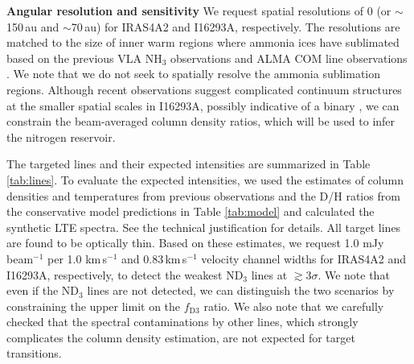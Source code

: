 \documentclass[12pt,a4paper]{article}  %
\begin{document}
\noindent \textbf{Angular resolution and sensitivity} \quad We request spatial resolutions of 0 (or $\sim$150\,au and $\sim$70\,au) for IRAS4A2 and I16293A, respectively. The resolutions are matched to the size of inner warm regions where ammonia ices have sublimated based on the previous VLA NH$_3$ observations \citep[][, article in preparation]{Choi10} and ALMA COM line observations \citep{Manigand20}. We note that we do not seek to spatially resolve the ammonia sublimation regions. Although recent observations suggest complicated continuum structures at the smaller spatial scales in I16293A, possibly indicative of a binary \citep{Maureira20}, we can constrain the beam-averaged column density ratios, which will be used to infer the nitrogen reservoir.

The targeted lines and their expected intensities are summarized in Table \ref{tab:lines}. To evaluate the expected intensities, we used the estimates of column densities and temperatures from previous observations and the D/H ratios from the conservative model predictions in Table \ref{tab:model} and calculated the synthetic LTE spectra. See the technical justification for details. 
All target lines are found to be optically thin. Based on these estimates, we request 1.0 mJy beam$^{-1}$ per 1.0 km\,s$^{-1}$ and 0.83\,km\,s$^{-1}$ velocity channel widths for IRAS4A2 and I16293A, respectively, to detect the weakest ND$_3$ lines at $\gtrsim$3$\sigma$. 
We note that even if the ND$_3$ lines are not detected, we can distinguish the two scenarios by constraining the upper limit on the $f_\mathrm{D3}$ ratio. We also note that we carefully checked that the spectral contaminations by other lines, which strongly complicates the column density estimation, are not expected for target transitions.
\end{document}
